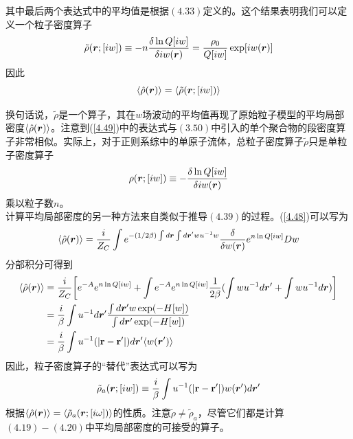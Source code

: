 其中最后两个表达式中的平均值是根据$(4.33)$定义的。这个结果表明我们可以定义一个粒子密度算子\\
\begin{equation}
\tilde{ \rho }(\bm{r};[i w]) \equiv -n \frac{\delta \ln Q[i w]}{\delta i w (\bm{r})} = \frac{\rho _{0}}{Q[i w]} \exp [i w(\bm{r})]
\label{4.49}
\end{equation}
因此\\
\begin{equation}
\langle \hat{ \rho }(\bm{r}) \rangle = \langle \tilde{ \rho } (\bm{r};[i w ]) \rangle
\end{equation}

换句话说，$\tilde{ \rho }$是一个算子，其在$ w $场波动的平均值再现了原始粒子模型的平均局部密度$ \langle \hat{ \rho }(\bm{r}) \rangle $。注意到(\ref{4.49})中的表达式与$(3.50)$中引入的单个聚合物的段密度算子非常相似。实际上，对于正则系综中的单原子流体，总粒子密度算子$ \tilde{ \rho } $只是单粒子密度算子\\
\begin{equation}
\rho (\bm{r};[i w]) \equiv - \frac{\delta \ln Q[i w]}{\delta i w (\bm{r})}
\end{equation}
乘以粒子数$n$。\\

计算平均局部密度的另一种方法来自类似于推导$(4.39)$的过程。(\ref{4.48})可以写为\\
\begin{equation}
\langle \hat{ \rho } (\bm{r}) \rangle = \frac{i}{Z_{C}} \int e^{- (1/2 \beta ) \int d\bm{r} \int d\bm{r}' w u^{-1} w } \frac{ \delta }{\delta w (\bm{r})} e^{n \ln Q[i w ]} D w
\end{equation}
分部积分可得到\\
\begin{equation}
\begin{aligned}
\langle \hat{ \rho } (\bm{r}) \rangle &=\frac{i}{Z_{C}} \bigg[ e^{-A} e^{n \ln Q[i w ]}+\int e^{-A} e^{n \ln Q[i w ]} \frac{1}{2 \beta}(\int wu^{-1}d\bm{r}'+\int wu^{-1}d\bm{r}) \bigg ]\\&=\frac{i}{\beta}\int u^{-1} d \bm{r}' \frac{\int d\bm{r}'w \exp(-H[w])}{\int d\bm{r}' \exp(-H[w])} \\&= \frac{i}{ \beta } \int u^{-1} (|\mathbf{r-r'}|) d\bm{r}' \langle w (\bm{r}') \rangle 
\end{aligned}
\label{4.53}
\end{equation}
因此，粒子密度算子的“替代”表达式可以写为\\
\begin{equation}
\tilde{ \rho }_{a}(\bm{r};[i w ]) \equiv \frac{i}{ \beta } \int  u^{-1}(|\mathbf{r-r'}|) w (\bm{r}')d\bm{r}'
\label{4.54}
\end{equation}
根据$\langle \hat{ \rho }(\bm{r}) \rangle = \langle \tilde{ \rho }_{a}(\bm{r};[i \omega ]) \rangle$的性质。注意$\tilde{ \rho } \neq \tilde{ \rho }_{a}$，尽管它们都是计算$(4.19)-(4.20)$中平均局部密度的可接受的算子。\\

